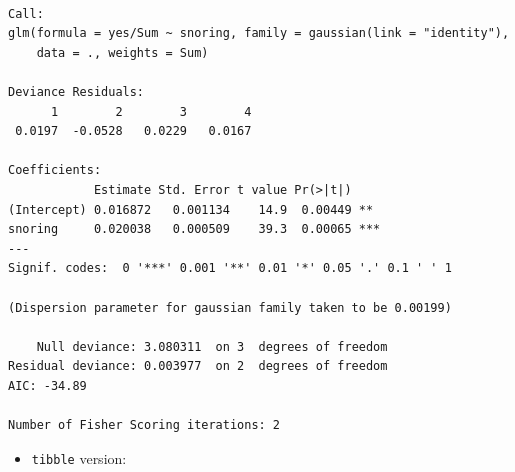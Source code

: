 \documentclass[]{book}
\newenvironment{Shaded}{\begin{snugshade}}{\end{snugshade}}
\newcommand{\DataTypeTok}[1]{\textcolor[rgb]{0.13,0.29,0.53}{#1}}
\newcommand{\DecValTok}[1]{\textcolor[rgb]{0.00,0.00,0.81}{#1}}
\newcommand{\KeywordTok}[1]{\textcolor[rgb]{0.13,0.29,0.53}{\textbf{#1}}}
\newcommand{\NormalTok}[1]{#1}
\newcommand{\OperatorTok}[1]{\textcolor[rgb]{0.81,0.36,0.00}{\textbf{#1}}}
\newcommand{\StringTok}[1]{\textcolor[rgb]{0.31,0.60,0.02}{#1}}
\providecommand{\tightlist}{%
  \setlength{\itemsep}{0pt}\setlength{\parskip}{0pt}}
\begin{document}
\begin{Shaded}
\end{Shaded}

\begin{verbatim}

Call:
glm(formula = yes/Sum ~ snoring, family = gaussian(link = "identity"), 
    data = ., weights = Sum)

Deviance Residuals: 
      1        2        3        4  
 0.0197  -0.0528   0.0229   0.0167  

Coefficients:
            Estimate Std. Error t value Pr(>|t|)    
(Intercept) 0.016872   0.001134    14.9  0.00449 ** 
snoring     0.020038   0.000509    39.3  0.00065 ***
---
Signif. codes:  0 '***' 0.001 '**' 0.01 '*' 0.05 '.' 0.1 ' ' 1

(Dispersion parameter for gaussian family taken to be 0.00199)

    Null deviance: 3.080311  on 3  degrees of freedom
Residual deviance: 0.003977  on 2  degrees of freedom
AIC: -34.89

Number of Fisher Scoring iterations: 2
\end{verbatim}

\begin{itemize}
\tightlist
\item
  \texttt{tibble} version:
\end{itemize}

\begin{Shaded}
\end{Shaded}
\end{document}
